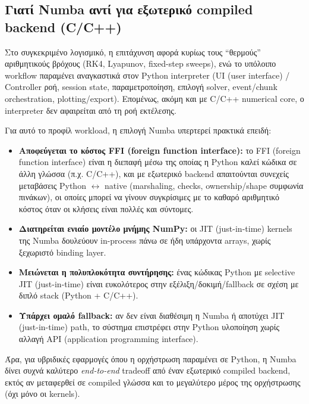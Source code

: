 \documentclass[11pt,a4paper]{report}
\begin{document}
\subsection{Γιατί Numba αντί για εξωτερικό compiled backend (C/C++)}
\label{subsec:numba-vs-external-backend}

\begin{importantbox}
Στο συγκεκριμένο λογισμικό, η επιτάχυνση αφορά κυρίως τους ``θερμούς'' αριθμητικούς
βρόχους (RK4, Lyapunov, fixed-step sweeps), ενώ το υπόλοιπο workflow
παραμένει αναγκαστικά στον Python interpreter (UI (user interface) / Controller ροή, session state,
παραμετροποίηση, επιλογή solver, event/chunk orchestration, plotting/export).
Επομένως, ακόμη και με C/C++ numerical core, ο interpreter δεν αφαιρείται από
τη ροή εκτέλεσης.

Για αυτό το προφίλ workload, η επιλογή Numba υπερτερεί πρακτικά επειδή:
\begin{itemize}
\item \textbf{Αποφεύγεται το κόστος FFI (foreign function interface):} το FFI (foreign function interface) είναι η διεπαφή μέσω της οποίας
η Python καλεί κώδικα σε άλλη γλώσσα (π.χ. C/C++), και με εξωτερικό backend απαιτούνται
συνεχείς μεταβάσεις Python $\leftrightarrow$ native (marshaling, checks, ownership/shape συμφωνία πινάκων),
οι οποίες μπορεί να γίνουν συγκρίσιμες με το καθαρό αριθμητικό κόστος όταν οι κλήσεις είναι πολλές και σύντομες.
\item \textbf{Διατηρείται ενιαίο μοντέλο μνήμης NumPy:} οι JIT (just-in-time) kernels της Numba δουλεύουν in-process πάνω
σε ήδη υπάρχοντα arrays, χωρίς ξεχωριστό binding layer.
\item \textbf{Μειώνεται η πολυπλοκότητα συντήρησης:} ένας κώδικας Python με selective JIT (just-in-time) είναι ευκολότερος
στην εξέλιξη/δοκιμή/fallback σε σχέση με διπλό stack (Python + C/C++).
\item \textbf{Υπάρχει ομαλό fallback:} αν δεν είναι διαθέσιμη η Numba ή αποτύχει JIT (just-in-time) path, το σύστημα επιστρέφει
στην Python υλοποίηση χωρίς αλλαγή API (application programming interface).
\end{itemize}

Άρα, για υβριδικές εφαρμογές όπου η ορχήστρωση παραμένει σε Python, η Numba
δίνει συχνά καλύτερο \textit{end-to-end} tradeoff από έναν εξωτερικό compiled backend,
εκτός αν μεταφερθεί σε compiled γλώσσα και το μεγαλύτερο μέρος της
ορχήστρωσης (όχι μόνο οι kernels).
\end{importantbox}
\end{document}
